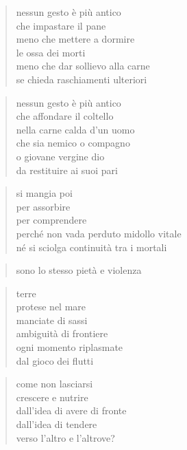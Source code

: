 

	\begin{verse}
		nessun gesto è più antico\\
		che impastare il pane\\
		meno che mettere a dormire\\
		le ossa dei morti\\
		meno che dar sollievo alla carne\\
		se chieda raschiamenti ulteriori
	\end{verse}

	\begin{verse}
		nessun gesto è più antico\\
		che affondare il coltello\\
		nella carne calda d’un uomo\\
		che sia nemico o compagno\\
		o giovane vergine dio\\
		da restituire ai suoi pari
	\end{verse}

	\begin{verse}
		si mangia poi\\
		per assorbire\\
		per comprendere\\
		perché non vada perduto midollo vitale\\
		né si sciolga continuità tra i mortali
	\end{verse}

	\begin{verse}
		sono lo stesso pietà e violenza
	\end{verse}


\clearpage



	\begin{verse}
		terre\\
		protese nel mare\\
		manciate di sassi\\
		ambiguità di frontiere\\
		ogni momento riplasmate\\
		dal gioco dei flutti
	\end{verse}

	\begin{verse}
		come non lasciarsi\\
		crescere e nutrire\\
		dall’idea di avere di fronte\\
		dall’idea di tendere\\
		verso l’altro e l’altrove?
	\end{verse}

